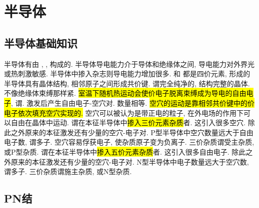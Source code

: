 \documentclass[hidelinks]{ctexart}
\begin{document}
\section{半导体} %
\label{sec:半导体}

\subsection{半导体基础知识} %
\label{sub:半导体基础知识}

\newpoint{}半导体有由 , , 构成的. 半导体导电能力介于导体和绝缘体之间, 导电能力对外界光或热刺激敏感. 半导体中掺入杂志则导电能力增加很多.
\newpoint{}和 都是四价元素, 形成的半导体具有晶体结构, 相邻原子之间形成共价键.
\newpoint{}谓完全纯净的, 结构完整的晶体. 不像绝缘体束缚那样紧. \hl{室温下随机热运动会使价电子脱离束缚成为导电的自由电子}, 谓. 激发后产生自由电子-空穴对. 数量相等. \hl{空穴的运动是靠相邻共价键中的价电子依次填充空穴实现的.} 空穴可以被认为是带正电的粒子, 在外电场的作用下可以自由在晶体中运动.
\newpoint{}谓在本征半导体中\hl{掺入三价元素杂质}者. 这引入很多空穴. 除此之外原来的本征激发还有少量的空穴-电子对. P型半导体中空穴数量远大于自由电子数, 谓多子. 空穴容易俘获电子, 使杂质原子变为负离子. 三价杂质谓受主杂质, 或P型杂质.
\newpoint{}谓在本征半导体中\hl{掺入五价元素杂质}者. 这引入很多自由电子. 除此之外原来的本征激发还有少量的空穴-电子对. N型半导体中电子数量远大于空穴数, 谓多子. 三价杂质谓施主杂质, 或N型杂质.


\subsection{PN结} %
\label{sub:pn结}
\end{document}
